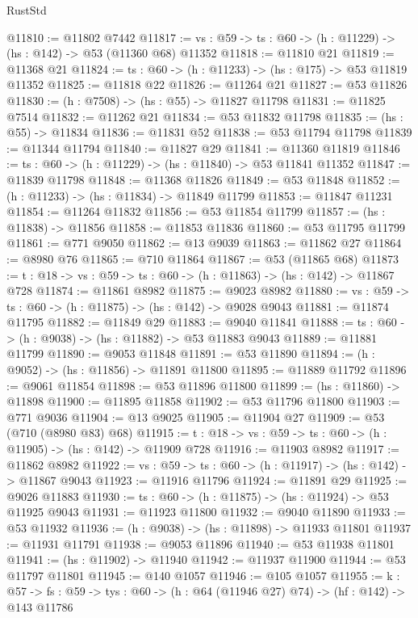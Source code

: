 \begin{lexlean}{RustStd}
\begin{coremodule}
@11810 := @11802 @7442
@11817 := {vs : @59} -> {ts : @60} -> (h : @11229) -> (hs : @142) -> @53 (@11360 @68) @11352
@11818 := @11810 @21
@11819 := @11368 @21
@11824 := {ts : @60} -> (h : @11233) -> (hs : @175) -> @53 @11819 @11352
@11825 := @11818 @22
@11826 := @11264 @21
@11827 := @53 @11826
@11830 := (h : @7508) -> (hs : @55) -> @11827 @11798
@11831 := @11825 @7514
@11832 := @11262 @21
@11834 := @53 @11832 @11798
@11835 := (hs : @55) -> @11834
@11836 := @11831 @52
@11838 := @53 @11794 @11798
@11839 := @11344 @11794
@11840 := @11827 @29
@11841 := @11360 @11819
@11846 := {ts : @60} -> (h : @11229) -> (hs : @11840) -> @53 @11841 @11352
@11847 := @11839 @11798
@11848 := @11368 @11826
@11849 := @53 @11848
@11852 := (h : @11233) -> (hs : @11834) -> @11849 @11799
@11853 := @11847 @11231
@11854 := @11264 @11832
@11856 := @53 @11854 @11799
@11857 := (hs : @11838) -> @11856
@11858 := @11853 @11836
@11860 := @53 @11795 @11799
@11861 := @771 @9050
@11862 := @13 @9039
@11863 := @11862 @27
@11864 := @8980 @76
@11865 := @710 @11864
@11867 := @53 (@11865 @68)
@11873 := {t : @18} -> {vs : @59} -> {ts : @60} -> (h : @11863) -> (hs : @142) -> @11867 @728
@11874 := @11861 @8982
@11875 := @9023 @8982
@11880 := {vs : @59} -> {ts : @60} -> (h : @11875) -> (hs : @142) -> @9028 @9043
@11881 := @11874 @11795
@11882 := @11849 @29
@11883 := @9040 @11841
@11888 := {ts : @60} -> (h : @9038) -> (hs : @11882) -> @53 @11883 @9043
@11889 := @11881 @11799
@11890 := @9053 @11848
@11891 := @53 @11890
@11894 := (h : @9052) -> (hs : @11856) -> @11891 @11800
@11895 := @11889 @11792
@11896 := @9061 @11854
@11898 := @53 @11896 @11800
@11899 := (hs : @11860) -> @11898
@11900 := @11895 @11858
@11902 := @53 @11796 @11800
@11903 := @771 @9036
@11904 := @13 @9025
@11905 := @11904 @27
@11909 := @53 (@710 (@8980 @83) @68)
@11915 := {t : @18} -> {vs : @59} -> {ts : @60} -> (h : @11905) -> (hs : @142) -> @11909 @728
@11916 := @11903 @8982
@11917 := @11862 @8982
@11922 := {vs : @59} -> {ts : @60} -> (h : @11917) -> (hs : @142) -> @11867 @9043
@11923 := @11916 @11796
@11924 := @11891 @29
@11925 := @9026 @11883
@11930 := {ts : @60} -> (h : @11875) -> (hs : @11924) -> @53 @11925 @9043
@11931 := @11923 @11800
@11932 := @9040 @11890
@11933 := @53 @11932
@11936 := (h : @9038) -> (hs : @11898) -> @11933 @11801
@11937 := @11931 @11791
@11938 := @9053 @11896
@11940 := @53 @11938 @11801
@11941 := (hs : @11902) -> @11940
@11942 := @11937 @11900
@11944 := @53 @11797 @11801
@11945 := @140 @1057
@11946 := @105 @1057
@11955 := {k : @57} ->
  {fs : @59} -> {tys : @60} -> (h : @64 (@11946 @27) @74) -> (hf : @142) -> @143 @11786

\end{coremodule}
\end{lexlean}
